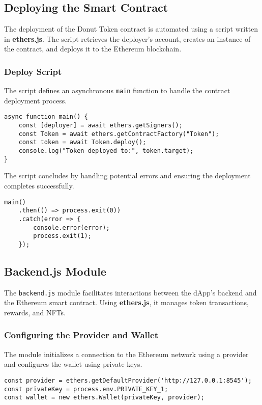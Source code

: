\documentclass[../main.tex]{subfiles}
\begin{document}

\subsection{Deploying the Smart Contract}
The deployment of the Donut Token contract is automated using a script written in \textbf{ethers.js}. The script retrieves the deployer's account, creates an instance of the contract, and deploys it to the Ethereum blockchain.

\subsubsection{Deploy Script}
The script defines an asynchronous \texttt{main} function to handle the contract deployment process.

\begin{verbatim}
async function main() {
    const [deployer] = await ethers.getSigners();
    const Token = await ethers.getContractFactory("Token");
    const token = await Token.deploy();
    console.log("Token deployed to:", token.target);
}
\end{verbatim}

The script concludes by handling potential errors and ensuring the deployment completes successfully.

\begin{verbatim}
main()
    .then(() => process.exit(0))
    .catch(error => {
        console.error(error);
        process.exit(1);
    });
\end{verbatim}


\subsection{Backend.js Module}
The \texttt{backend.js} module facilitates interactions between the dApp's backend and the Ethereum smart contract. Using \textbf{ethers.js}, it manages token transactions, rewards, and NFTs.

\subsubsection{Configuring the Provider and Wallet}
The module initializes a connection to the Ethereum network using a provider and configures the wallet using private keys.

\begin{verbatim}
const provider = ethers.getDefaultProvider('http://127.0.0.1:8545');
const privateKey = process.env.PRIVATE_KEY_1;
const wallet = new ethers.Wallet(privateKey, provider);
\end{verbatim}
\end{document}

